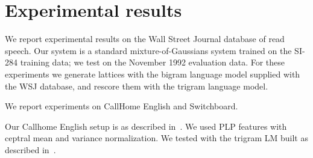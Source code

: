 \documentclass{article}
\begin{document}


\section{Experimental results}
\label{sec:exp}

We report experimental results on the Wall Street Journal database of
read speech.  
Our system is a standard mixture-of-Gaussians system trained on the SI-284
training data; we test on the November 1992 evaluation data.  
For these experiments we generate lattices with the bigram language model
supplied with the WSJ database, and rescore them with the trigram language model.



We report experiments on CallHome English and Switchboard.  

Our Callhome English setup is as described in~\cite{ubmconf,ubmpaper}.  
We used PLP features with ceptral mean and variance normalization.  We tested 
with the trigram LM built as described in~\cite{ubmpaper}.



\end{document}
